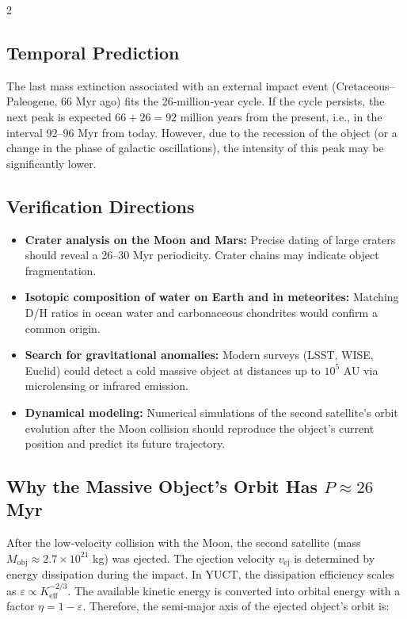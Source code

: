 \documentclass[11pt,a4paper]{article}
\begin{document}
\begin{multicols}{2}
		\subsection{Temporal Prediction}
		
		The last mass extinction associated with an external impact event (Cretaceous–Paleogene, 66 Myr ago) fits the 26‑million‑year cycle. If the cycle persists, the next peak is expected \(66 + 26 = 92\) million years from the present, i.e., in the interval 92–96 Myr from today. However, due to the recession of the object (or a change in the phase of galactic oscillations), the intensity of this peak may be significantly lower.
		
		\subsection{Verification Directions}
		
		\begin{itemize}
			\item \textbf{Crater analysis on the Moon and Mars:} Precise dating of large craters should reveal a 26–30 Myr periodicity. Crater chains may indicate object fragmentation.
			\item \textbf{Isotopic composition of water on Earth and in meteorites:} Matching D/H ratios in ocean water and carbonaceous chondrites would confirm a common origin.
			\item \textbf{Search for gravitational anomalies:} Modern surveys (LSST, WISE, Euclid) could detect a cold massive object at distances up to \(10^5\) AU via microlensing or infrared emission.
			\item \textbf{Dynamical modeling:} Numerical simulations of the second satellite's orbit evolution after the Moon collision should reproduce the object's current position and predict its future trajectory.
		\end{itemize}
		
		\subsection{Why the Massive Object's Orbit Has $P \approx 26$ Myr}
		
		After the low‑velocity collision with the Moon, the second satellite (mass $M_{\text{obj}} \approx 2.7\times10^{21}$ kg) was ejected. The ejection velocity $v_{\text{ej}}$ is determined by energy dissipation during the impact. In YUCT, the dissipation efficiency scales as $\varepsilon \propto K_{\mathrm{eff}}^{-2/3}$. The available kinetic energy is converted into orbital energy with a factor $\eta = 1 - \varepsilon$. Therefore, the semi‑major axis of the ejected object's orbit is:
		

\end{multicols}
\end{document}
